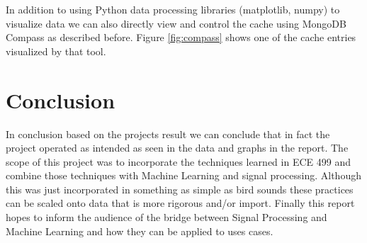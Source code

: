 \documentclass[conference,twoside]{IEEEtran}
\begin{document}
In addition to using Python data processing libraries (matplotlib, numpy) to visualize data we can also directly view and control the cache using MongoDB Compass\cite{mongodbcompass} as described before. Figure \ref{fig:compass} shows one of the cache entries visualized by that tool.

\section{Conclusion}
In conclusion based on the projects result we can conclude that in fact the project operated as intended as seen in the data and graphs in the report. The scope of this project was to incorporate the techniques learned in ECE 499 and combine those techniques with Machine Learning and signal processing. Although this was just incorporated in something as simple as bird sounds these practices can be scaled onto data that is more rigorous and/or import. Finally this report hopes to inform the audience of the bridge between Signal Processing and Machine Learning and how they can be applied to uses cases.



\end{document}
